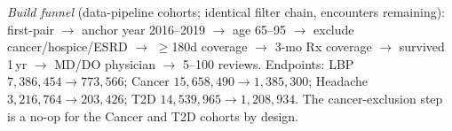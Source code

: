 \begin{table}[htbp]
\centering
\caption{Cohort descriptive statistics across the five analytic cohorts (Table~1, C0 data anchor).
Analytic samples are Medicare first-pair encounters (2015--2020); see build-funnel note below.}
\label{tab:descriptives}
\small

\par\smallskip
\begin{flushleft}
\footnotesize
\textit{Build funnel} (data-pipeline cohorts; identical filter chain, encounters remaining):
first-pair $\rightarrow$ anchor year 2016--2019 $\rightarrow$ age 65--95 $\rightarrow$
exclude cancer/hospice/ESRD $\rightarrow$ $\geq$180d coverage $\rightarrow$ 3-mo Rx coverage
$\rightarrow$ survived 1\,yr $\rightarrow$ MD/DO physician $\rightarrow$ 5--100 reviews.
Endpoints: LBP $7{,}386{,}454\!\rightarrow\!773{,}566$; Cancer $15{,}658{,}490\!\rightarrow\!1{,}385{,}300$;
Headache $3{,}216{,}764\!\rightarrow\!203{,}426$; T2D $14{,}539{,}965\!\rightarrow\!1{,}208{,}934$.
The cancer-exclusion step is a no-op for the Cancer and T2D cohorts by design.


\end{flushleft}
\end{table}

